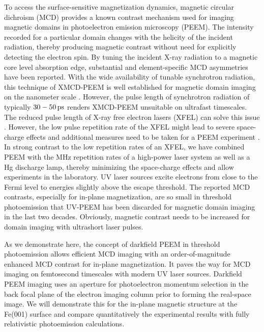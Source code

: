 \documentclass[prl,twocolumn,floatfix,superscriptaddress,aps]{revtex4-2}
\begin{document}
To access the surface-sensitive magnetization dynamics, magnetic circular dichroism (MCD) provides a known contrast mechanism used for imaging magnetic domains in photoelectron emission microscopy (PEEM). The intensity recorded for a particular domain changes with the helicity of the incident radiation, thereby producing magnetic contrast without need for explicitly detecting the electron spin. By tuning the incident X-ray radiation to a magnetic core level absorption edge, substantial and element-specific MCD asymmetries have been reported. With the wide availability of tunable synchrotron radiation, this technique of XMCD-PEEM is well established for magnetic domain imaging on the nanometer scale \cite{kuch15}. However, the pulse length of synchrotron radiation of typically $\unit[30-50]{ps}$ renders XMCD-PEEM unsuitable on ultrafast timescales. 
The reduced pulse length of X-ray free electron lasers (XFEL) can solve this issue \cite{Kutnyakhov20}. However, the low pulse repetition rate of the XFEL might lead to severe space-charge effects and additional measures need to be taken for a PEEM experiment \cite{Schoenhense18,Schoenhense21}. In strong contrast to the low repetition rates of an XFEL, we have combined PEEM with the MHz repetition rates of a high-power laser system as well as a Hg discharge lamp, thereby minimizing the space-charge effects and allow experiments in the laboratory. UV laser sources excite electrons from close to the Fermi level to energies slightly above the escape threshold. The reported MCD contrasts, especially for in-plane magnetization, are so small in threshold photoemission \cite{marx2000} that UV-PEEM has been discarded for magnetic domain imaging in the last two decades. Obviously, magnetic contrast needs to be increased for domain imaging with ultrashort laser pulses.

As we demonstrate here, the concept of darkfield PEEM in threshold photoemission allows efficient MCD imaging with an order-of-magnitude enhanced MCD contrast for in-plane magnetization. It paves the way for MCD imaging on femtosecond timescales with modern UV laser sources. Darkfield PEEM imaging uses an aperture for photoelectron momentum selection in the back focal plane of the electron imaging column prior to forming the real-space image. We will demonstrate this for the in-plane magnetic structure at the Fe(001) surface and compare quantitatively the experimental results with fully relativistic photoemission calculations.
\end{document}
